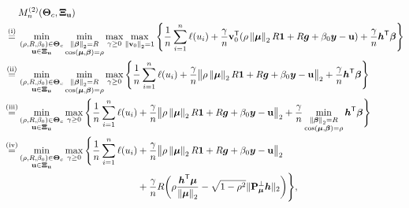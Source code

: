 \begin{align}
        & M_n^{(2)}(\bTheta_{c}, \bXi_{\bu}) 
        \notag
        \\
        \overset{\mathmakebox[0pt][c]{\text{(i)}}}{=} {} & 
        \min_{ \substack{ (\rho, R, \beta_0) \in \bTheta_{c} \\ \bu \in \bXi_{\bu} } } \min_{ \substack{ \norm{\vbeta}_2 = R \\ \cos(\vmu, \vbeta) = \rho } }
        \max_{\gamma \ge 0} \max_{\norm{\bv_0}_2 = 1}
        \left\{ \frac1n \sum_{i=1}^n \ell( u_i ) +
        \frac{\gamma}{n} \bv_0^\top (\rho\norm{\vmu}_2 R \bone + R\vg + \beta_0 \yy  - \bu )
        + \frac{\gamma}{n} \hh^\top\vbeta 
        \right\} 
        \notag
        \\
        \overset{\mathmakebox[0pt][c]{\text{(ii)}}}{=} {} &  
        \min_{ \substack{ (\rho, R, \beta_0) \in \bTheta_{c} \\ \bu \in \bXi_{\bu} } } \min_{ \substack{ \norm{\vbeta}_2 = R \\ \cos(\vmu, \vbeta) = \rho } }
        \max_{\gamma \ge 0} 
        \left\{ \frac1n \sum_{i=1}^n \ell( u_i ) +
        \frac{\gamma}{n} \bigl\| \rho\norm{\vmu}_2 R \bone + R\vg + \beta_0 \yy  - \bu \bigr\|_2
        + \frac{\gamma}{n} \hh^\top\vbeta 
        \right\} 
        \notag
        \\
        \overset{\mathmakebox[0pt][c]{\text{(iii)}}}{=} {} & 
        \min_{ \substack{ (\rho, R, \beta_0) \in \bTheta_{c} \\ \bu \in \bXi_{\bu} } } 
        \max_{\gamma \ge 0} 
        \, \Biggl\{ 
            \frac1n \sum_{i=1}^n \ell( u_i )
        + \frac{\gamma}{n} \bigl\| \rho\norm{\vmu}_2 R \bone + R\vg + \beta_0 \yy  - \bu \bigr\|_2
        + \frac{\gamma}{n} \min_{ \substack{ \norm{\vbeta}_2 = R \\ \cos(\vmu, \vbeta) = \rho } } \hh^\top\vbeta  
        \Biggr\} 
        \notag
        \\
        \overset{\mathmakebox[0pt][c]{\text{(iv)}}}{=} {} & 
        \min_{ \substack{ (\rho, R, \beta_0) \in \bTheta_{c} \\ \bu \in \bXi_{\bu} } } 
        \max_{\gamma \ge 0} 
        \, \Biggl\{ 
            \frac1n \sum_{i=1}^n \ell( u_i )
        + \frac{\gamma}{n} \bigl\| \rho\norm{\vmu}_2 R \bone + R\vg + \beta_0 \yy  - \bu \bigr\|_2
        \notag
        \\
        & 
        \phantom{
        \min_{ \substack{ (\rho, R, \beta_0) \in \bTheta_{c} \\ \bu \in \bXi_{\bu} } } 
        \max_{\gamma \ge 0} 
        \, \Biggl\{ 
            \frac1n \sum_{i=1}^n \ell( u_i )
        }
        \, + \frac{\gamma}{n} R\biggl( \rho\frac{\hh^\top \vmu}{\norm{\vmu}_2} - \sqrt{1 - \rho^2} \| \bP_{\bmu}^\perp \hh \|_2 \biggr)  
        \Biggr\},
        \label{eq:Mn(2)}
\end{align}
